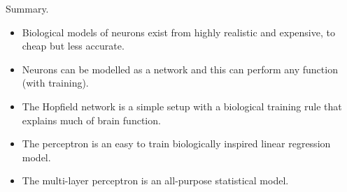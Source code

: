 \documentclass[
  ignorenonframetext,
]{beamer}
\begin{document}
\begin{frame}{Summary.}
\protect\hypertarget{summary.}{}
\begin{itemize}
\item
  Biological models of neurons exist from highly realistic and
  expensive, to cheap but less accurate.
\item
  Neurons can be modelled as a network and this can perform any function
  (with training).
\item
  The Hopfield network is a simple setup with a biological training rule
  that explains much of brain function.
\item
  The perceptron is an easy to train biologically inspired linear
  regression model.
\item
  The multi-layer perceptron is an all-purpose statistical model.
\end{itemize}
\end{frame}
\end{document}
